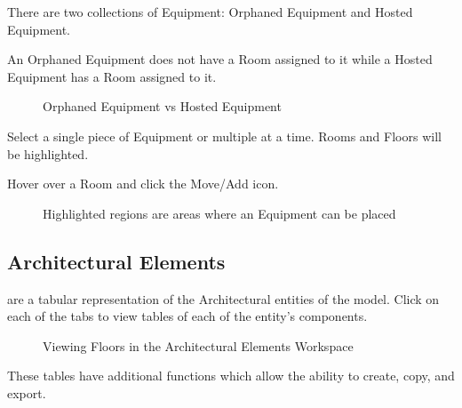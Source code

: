 \documentclass[letterpaper,10pt,english]{sphinxmanual}
\begin{document}
There are two collections of Equipment: Orphaned Equipment and Hosted Equipment.

An Orphaned Equipment does not have a Room assigned to it while a Hosted Equipment has a Room assigned to it.

\begin{figure}[H]
\centering
\capstart

\noindent{}
\caption{Orphaned Equipment vs Hosted Equipment}\label{\detokenize{docs/userguide/definingarchitecturalelements/floorplans/index-floor-plans:id14}}\end{figure}

Select a single piece of Equipment or multiple at a time.  Rooms and Floors will be highlighted.

Hover over a Room and click the Move/Add icon.

\begin{figure}[H]
\centering
\capstart

\noindent{}
\caption{Highlighted regions are areas where an Equipment can be placed}\label{\detokenize{docs/userguide/definingarchitecturalelements/floorplans/index-floor-plans:id15}}\end{figure}


\subsection{Architectural Elements}
\label{\detokenize{docs/userguide/index-user_guide:architectural-elements}}
{\hyperref[\detokenize{docs/userguide/definingarchitecturalelements/archelements/index-arch-elements::doc}]{}} are a tabular representation of the Architectural entities of the model.
\label{\detokenize{docs/userguide/definingarchitecturalelements/archelements/index-arch-elements:arch-elements}}
Click on each of the tabs to view tables of each of the entity’s components.

\begin{figure}[H]
\centering
\capstart

\noindent{}
\caption{Viewing Floors in the Architectural Elements Workspace}\label{\detokenize{docs/userguide/definingarchitecturalelements/archelements/index-arch-elements:id4}}\end{figure}

These tables have additional functions which allow the ability to create, copy, and export.
\end{document}
